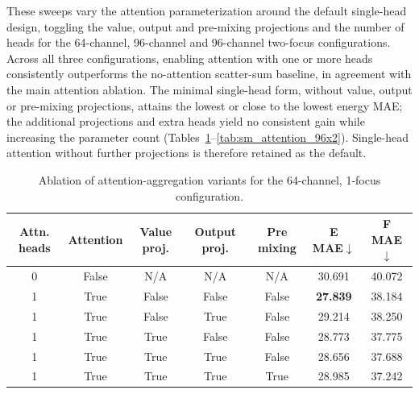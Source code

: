 These sweeps vary the attention parameterization around the default single-head
design, toggling the value, output and pre-mixing projections and the number of
heads for the 64-channel, 96-channel and 96-channel two-focus configurations.
Across all three configurations, enabling attention with one or more heads
consistently outperforms the no-attention scatter-sum baseline, in agreement
with the main attention ablation. The minimal single-head form, without value,
output or pre-mixing projections, attains the lowest or close to the lowest
energy MAE; the additional projections and extra heads yield no consistent gain
while increasing the parameter count
(Tables~\ref{tab:sm_attention_64}--\ref{tab:sm_attention_96x2}). Single-head
attention without further projections is therefore retained as the default.

\begin{table}[ht]
    \centering
    \scriptsize
    \caption{Ablation of attention-aggregation variants for the 64-channel, 1-focus configuration.}
    \label{tab:sm_attention_64}
    \begin{tabular*}{\linewidth}{@{\extracolsep{\fill}}ccccccc@{}}
        \toprule
        \textbf{Attn. heads}       & \textbf{Attention}         & \textbf{Value proj.} &
        \textbf{Output proj.}      & \textbf{Pre mixing}        &
        \textbf{E MAE}$\downarrow$ & \textbf{F MAE}$\downarrow$                                                                            \\
        \midrule
        0                          & False                      & N/A                  & N/A   & N/A   & 30.691          & 40.072          \\
        1                          & True                       & False                & False & False & \textbf{27.839} & 38.184          \\
        1                          & True                       & False                & True  & False & 29.214          & 38.250          \\
        1                          & True                       & True                 & False & False & 28.773          & 37.775          \\
        1                          & True                       & True                 & True  & False & 28.656          & 37.688          \\
        1                          & True                       & True                 & True  & True  & 28.985          & 37.242          \\

\end{tabular*}
\end{table}
